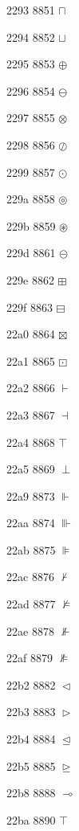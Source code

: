 \documentclass[11pt]{article}
\begin{document}
2293 8851 \ensuremath{\sqcap}

2294 8852 \ensuremath{\sqcup}

2295 8853 \ensuremath{\oplus}

2296 8854 \ensuremath{\ominus}

2297 8855 \ensuremath{\otimes}

2298 8856 \ensuremath{\oslash}

2299 8857 \ensuremath{\odot}

229a 8858 \ensuremath{\circledcirc}

229b 8859 \ensuremath{\circledast}

229d 8861 \ensuremath{\circleddash}

229e 8862 \ensuremath{\boxplus}

229f 8863 \ensuremath{\boxminus}

22a0 8864 \ensuremath{\boxtimes}

22a1 8865 \ensuremath{\boxdot}

22a2 8866 \ensuremath{\vdash}

22a3 8867 \ensuremath{\dashv}

22a4 8868 \ensuremath{\top}

22a5 8869 \ensuremath{\perp}



22a9 8873 \ensuremath{\Vdash}

22aa 8874 \ensuremath{\Vvdash}

22ab 8875 \ensuremath{\VDash}

22ac 8876 \ensuremath{\nvdash}

22ad 8877 \ensuremath{\nvDash}

22ae 8878 \ensuremath{\nVdash}

22af 8879 \ensuremath{\nVDash}

22b2 8882 \ensuremath{\vartriangleleft}

22b3 8883 \ensuremath{\vartriangleright}

22b4 8884 \ensuremath{\trianglelefteq}

22b5 8885 \ensuremath{\trianglerighteq}



22b8 8888 \ensuremath{\multimap}


22ba 8890 \ensuremath{\intercal}
\end{document}
